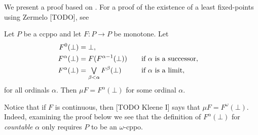 \documentclass[a4paper, 11pt, article, danish, oneside]{memoir}
\DeclareMathOperator*{\smallbigvee}{\textstyle\bigvee}
\DeclareMathOperator*{\bigjoin}{\mathchoice
    {\smallbigvee}%
    {\bigvee}%
    {\bigvee}%
    {\bigvee}%
}
\begin{document}
We present a proof based on \textcite[Exercise~8.19]{davey-priestley-order}. For a proof of the existence of a least fixed-points using Zermelo [TODO], see \textcite[Theorem~7.36]{moschovakis-set-theory}

\begin{theorem}
    Let $P$ be a ccppo and let $F \colon P \to P$ be monotone. Let
    \begin{alignat*}{2}
        F^0(\bot)
            &= \bot, \\
        F^{\alpha}(\bot)
            &= F(F^{\alpha-1}(\bot))
            \quad &&\text{if $\alpha$ is a successor}, \\
        F^\alpha(\bot)
            &= \bigjoin_{\beta < \alpha} F^\beta(\bot)
            \quad &&\text{if $\alpha$ is a limit},
    \end{alignat*}
    for all ordinals $\alpha$. Then $\mu F = F^\alpha(\bot)$ for some ordinal $\alpha$.
\end{theorem}
%
Notice that if $F$ is continuous, then [TODO Kleene I] says that $\mu F = F^\omega(\bot)$. Indeed, examining the proof below we see that the definition of $F^\alpha(\bot)$ for \emph{countable} $\alpha$ only requires $P$ to be an $\omega$-cppo.
\end{document}
